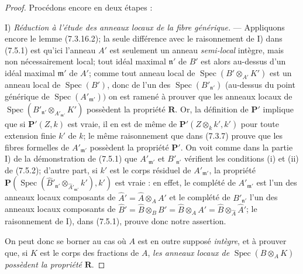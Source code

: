 \begin{proof}
Procédons encore en deux étapes :

I) \emph{Réduction à l'étude des anneaux locaux de la fibre générique.} ---
Appliquons encore le lemme (7.3.16.2); la seule différence avec le
raisonnement de I) dans (7.5.1) est qu'ici l'anneau $A'$ est seulement un
anneau \emph{semi-local} intègre, mais non nécessairement local; tout idéal maximal
$\mathfrak n'$ de $B'$ est alors au-dessus d'un idéal maximal $\mathfrak m'$
de $A'$; comme tout anneau local de
$\operatorname{Spec}(B'\otimes_{A'}K')$ est un anneau local de
$\operatorname{Spec}(B')$, donc de l'un des
$\operatorname{Spec}(B'_{\mathfrak n'})$ (au-dessus du point générique de
$\operatorname{Spec}(A'_{\mathfrak m'}))$ on est ramené à prouver que les
anneaux locaux de
$\operatorname{Spec}(B'_{\mathfrak n'}
\otimes_{A'_{\mathfrak m'}}K')$
possèdent la propriété $\boldsymbol R$. Or, la définition de
$\boldsymbol P'$ implique que si $\boldsymbol P'(Z,k)$ est vraie, il en est
de même de $\boldsymbol P'(Z\otimes_k k',k')$ pour toute extension finie
$k'$ de $k$; le même raisonnement que dans (7.3.7) prouve que les fibres
formelles de $A'_{\mathfrak m'}$ possèdent la propriété $\boldsymbol P'$.
On voit comme dans la partie I) de la démonstration de (7.5.1) que
$A'_{\mathfrak m'}$ et $B'_{\mathfrak n'}$ vérifient les conditions (i) et
(ii) de (7.5.2); d'autre part, si $k'$ est le corps résiduel de
$A'_{\mathfrak m'}$, la propriété
$\boldsymbol P(\operatorname{Spec}(\widehat{B}'_{\mathfrak n'}
\otimes_{\widehat{A}'_{\mathfrak m'}}k'),k')$
est vraie : en effet, le complété de $A'_{\mathfrak m'}$ est l'un des
anneaux locaux composants de
$\widehat{A}'=\widehat A\otimes_A A'$ et le complété de
$B'_{\mathfrak n'}$ l'un des anneaux locaux composants de
$\widehat{B}'=\widehat B\otimes_B B'
=\widehat B\otimes_A A'
=\widehat B\otimes_{\widehat A}\widehat{A}'$;
le raisonnement de I), dans (7.5.1), prouve donc notre assertion.

On peut donc se borner au cas où $A$ est en outre supposé \emph{intègre}, et à
prouver que, si $K$ est le corps des fractions de $A$, \emph{les anneaux locaux de}
$\operatorname{Spec}(B\otimes_A K)$ \emph{possèdent la propriété}
$\boldsymbol R$.


\end{proof}
